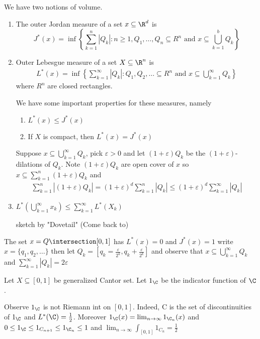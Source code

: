 \noindent We have two notions of volume.
\begin{enumerate}
	\item The outer Jordan measure of a set $x \subseteq \R^d$ is
			\[
				J^* (x)
				= \inf \left\{ \sum_{k=1}^{n} |Q_k| : n \geq 1, Q_1, \ldots, Q_n \subseteq R^n \text{ and }
				x \subseteq \bigcup_{k=1}^{b} Q_k \right\}
			\]
	\item Outer Lebesgue measure of a set $X \subseteq \R^n$ is
		\begin{align*}
			L^*(x) 
			= \inf \left\{ \sum_{k=1}^{\infty}|Q_k| : Q_1, Q_2, \ldots \subseteq R^n \text{ and }
			x \subseteq \bigcup_{k=1}^{\infty} Q_k \right\}
		\end{align*}
		where $R^n$ are closed rectangles.

		We have some important properties for these measures, namely

		\begin{enumerate}
			\item $L^*(x) \leq J^* (x)$
			\item If  $X$ is compact, then $L^*(x) = J^*(x)$
		\end{enumerate}
		\begin{solution}
			Suppose $x \subseteq \bigcup_{k=1}^{\infty} Q_k$, pick $\varepsilon > 0$ and let  $(1 + \varepsilon)Q_k$ be the $(1 + \varepsilon)$-dilations of $Q_k$. Note $(1+ \varepsilon ) Q_k$ are open cover of  $x$ so $x \subseteq \sum_{k=1}^n (1+\varepsilon) Q_k$ and
			\begin{align*}
				\sum_{k=1}^{n} |(1 + \varepsilon) Q_k| = (1+\varepsilon)^d \sum_{k=1}^{n}|Q_k| \leq (1 + \varepsilon)^d \sum_{k=1}^{\infty} | Q_k|
			\end{align*}
		\end{solution}

	\item $L^* \left(\bigcup^{\infty}_{k = 1} x_k \right) \leq \sum_{k = 1}^{\infty} L^* (X_{k})$

		\begin{solution}
			sketch by "Dovetail" (Come back to)
		\end{solution}
\end{enumerate}

\begin{example}
	The set $x = Q \intersection [0,1]$ has  $L^*(x) = 0$ and  $J^*(x) = 1$ write  $x = \{q_1, q_2, \ldots \}$ then let $Q_k = [q_k =  \frac{\varepsilon}{2^k}, q_k + \frac{\varepsilon}{2^k}]$
	and observe that $x \subseteq \bigcup_{k = 1}^{\infty} Q_k$ and $\sum_{k=1}^{\infty} |Q_k| = 2 \varepsilon$
\end{example}

\begin{example}
	Let $X \subseteq [0,1]$ be generalized Cantor set. Let $1_{\C}$ be the indicator function of $\C$.

	Observe $1_ {\C}$ is not Riemann int on $[0,1]$. Indeed, C is the set of discontinuities of $1_{\C}$ and $L^*(\C) = \frac{1}{2}$. Moreover $1_{\C}(x) = \lim_{n\to \infty} 1_{\C_n} (x)$ and
	$0 \leq 1_{\C} \leq 1_{C_{n+1}} \leq 1_{\C_{n}} \leq 1$ and
	$\lim_{n \to \infty} \int_{[0,1]} 1_{C_{n}} = \frac{1}{2} $
\end{example}
